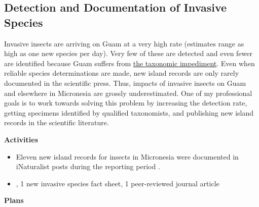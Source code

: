 \documentclass[12pt,english]{scrartcl}
\newcommand{\activities}{\medskip\textbf{Activities}}
\newcommand{\plans}{\medskip\textbf{Plans}}
\begin{document}
\subsection{Detection and Documentation of Invasive Species}
\begin{refsection}

Invasive insects are arriving on Guam at a very high rate (estimates
range as high as one new species per day). Very few of these are detected
and even fewer are identified because Guam suffers from \href{https://en.wikipedia.org/wiki/Taxonomic_impediment}{the taxonomic impediment}.
Even when reliable species determinations are made, new island records
are only rarely documented in the scientific press. Thus, impacts
of invasive insects on Guam and elsewhere in Micronesia are grossly
underestimated. One of my professional goals is to work towards solving
this problem by increasing the detection rate, getting specimens identified
by qualified taxonomists, and publishing new island records in the
scientific literature.

\activities

\begin{itemize}
	
\item Eleven new island records for insects in Micronesia were documented in iNaturalist posts during the reporting period \cite{inat36470788,inat36285968,inat35845152,inat32572967,inat31326484,inat29333274,inat18166461,inat16734728,inat15747194,inat15067449,inat13466275}.

\item , 1 new invasive
species fact sheet, 1 peer-reviewed journal article

%
%

\end{itemize}

\plans


\end{refsection}
\end{document}
